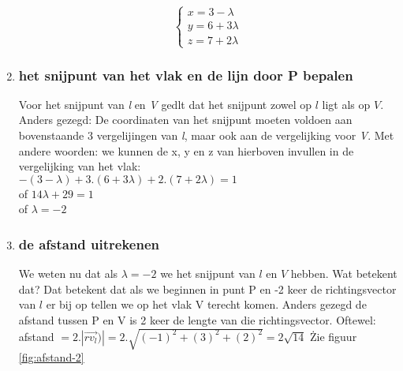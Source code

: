 \begin{enumerate}[label=(\alph*)]
\[\begin{cases}
x =  3 -\lambda \\
y =  6 + 3\lambda\\
z = 7 + 2\lambda
\end{cases}
\] 
\item \subsubsection{het snijpunt van  het  vlak en de lijn door P bepalen}
Voor het snijpunt van\textit{ l} en \textit{V} gedlt dat het snijpunt zowel op $  l $ ligt als op $ V $. Anders gezegd: De coordinaten  van het snijpunt moeten voldoen aan bovenstaande 3 vergelijingen van\textit{ l}, maar ook aan de vergelijking voor \textit{V}. Met andere woorden: we kunnen de x, y en z van hierboven invullen in de vergelijking van het vlak:\\
$ -(3 -\lambda) + 3.(6 + 3\lambda) + 2.(7 + 2\lambda) = 1$ \\
of $ 14\lambda + 29 = 1 $ \\of $  \lambda = -2 $

\item \subsubsection{de afstand uitrekenen}
We weten nu dat als $  \lambda = -2 $ we het snijpunt van $ l  $ en $ V $ hebben. Wat betekent dat? Dat betekent dat als we beginnen in punt P en -2 keer de richtingsvector van $  l $ er bij op tellen we op het vlak V terecht komen.
Anders gezegd de afstand tussen P en V is 2 keer de lengte van die richtingsvector. Oftewel: 
afstand $ = 2. |\overrightarrow{rv_{l}})| = 2. \sqrt{(-1)^{2} + (3)^{2} + (2)^{2} } = 2\sqrt{14} $ \. Zie  figuur  \ref{fig:afstand-2}
\end{enumerate}	



